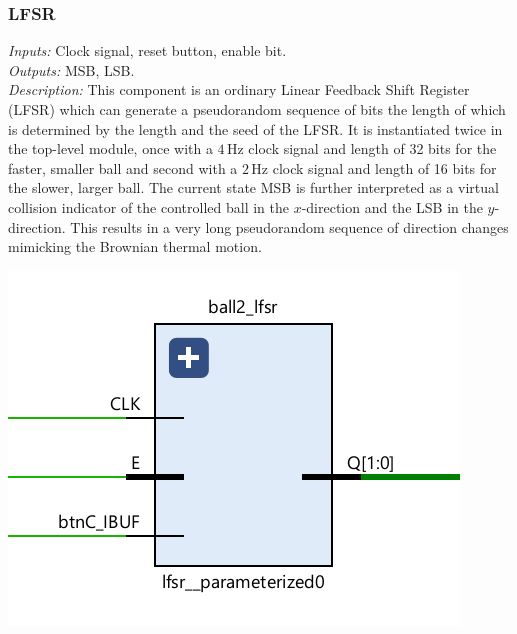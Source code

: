 \documentclass[11pt,a4paper]{article}
\def\Hz{\,\mathrm{Hz}}
\begin{document}
        \subsubsection*{LFSR}
        \begin{minipage}{.45\textwidth}
            \emph{Inputs:} Clock signal, reset button, enable bit.\\[1em]
            \emph{Outputs:} MSB, LSB.\\[1em]
            \emph{Description:} This component is an ordinary Linear Feedback Shift Register (LFSR) which can generate a pseudorandom sequence of bits the length of which is determined by the length and the seed of the LFSR. It is instantiated twice in the top-level module, once with a $4\Hz$ clock signal and length of 32 bits for the faster, smaller ball and second with a $2\Hz$ clock signal and length of 16 bits for the slower, larger ball. The current state MSB is further interpreted as a virtual collision indicator of the controlled ball in the $x$-direction and the LSB in the $y$-direction. This results in a very long pseudorandom sequence of direction changes mimicking the Brownian thermal motion.
        \end{minipage}
        \hfill
        \begin{minipage}{.45\textwidth}
            \includegraphics[width=\textwidth]{src/lfsr.png}
        \end{minipage}
\end{document}

